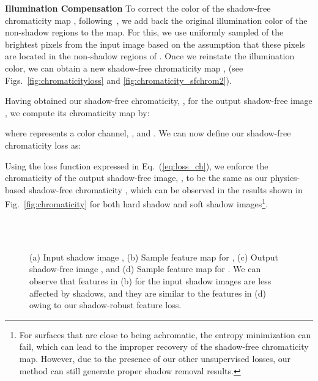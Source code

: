 \documentclass[10pt,twocolumn,letterpaper]{article}
\begin{document}
\vspace{0.2cm}
\noindent \textbf{Illumination Compensation} 
To correct the color of the shadow-free chromaticity map , following~\cite{Drew03}, we add back the original illumination color of the non-shadow regions to the map.
For this, we use uniformly sampled  of the brightest pixels from the input image  based on the assumption that these pixels are located in the non-shadow regions of . 
Once we reinstate the illumination color, we can obtain a new shadow-free chromaticity map ,  (see Figs.~\ref{fig:chromaticityloss} and \ref{fig:chromaticity_sfchrom2}).

Having obtained our shadow-free chromaticity, , for the output shadow-free image , we compute its chromaticity map  by:

where  represents a color channel, , and . We can now define our shadow-free chromaticity loss as:

Using the loss function expressed in Eq.~(\ref{eq:loss_ch}), we enforce the chromaticity of the output shadow-free image, , to be the same as our physics-based shadow-free chromaticity , which can be observed in the results shown in Fig.~\ref{fig:chromaticity} for both hard shadow and soft shadow images\footnote{For surfaces that are close to being achromatic, the entropy minimization can fail, which can lead to the improper recovery of the shadow-free chromaticity map. However, due to the presence of our other unsupervised losses, our method can still generate proper shadow removal results.}.


\begin{figure}[t]
	\centering
\captionsetup[subfloat]{farskip=2pt}
	\hfill
	\hfill
	\hfill
	\hfill\\
	\vspace{-0.01in}
	\setcounter{subfigure}{0}
	\hfill
	\hfill
	\hfill
	\hfill\\
	\vspace{-0.01in}
	\caption{(a) Input shadow image , (b) Sample feature map for , (c) Output shadow-free image , and (d) Sample feature map for . We can observe that features in (b) for the input shadow images are less affected by shadows, and they are similar to the features in (d) owing to our shadow-robust feature loss.}
\label{fig:featureloss}
\end{figure}
\end{document}

